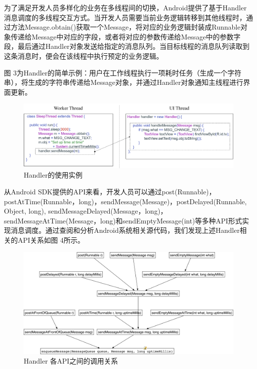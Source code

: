 为了满足开发人员多样化的业务在多线程间的切换，Android提供了基于Handler消息调度的多线程交互方式。当开发人员需要当前业务逻辑转移到其他线程时，通过方法Message.obtain()获取一个Message，将对应的业务逻辑封装成Runnable对象传递给Message中对应的字段，或者将对应的参数传递给Message中的参数字段，最后通过Handler对象发送给指定的消息队列。当目标线程的消息队列读取到这条消息时，便会在该线程中执行预定的业务逻辑。

图 3为Handler的简单示例：用户在工作线程执行一项耗时任务（生成一个字符串），将生成的字符串传递给Message对象，并通过Handler对象通知主线程进行界面更新。
 
 
\begin{figure}
	\centering
	\includegraphics[width=\textwidth]{./Figures/handler-code.png}
	\caption{Handler的使用实例}
	\label{fig:handler-code}
\end{figure}


从Android SDK提供的API来看，开发人员可以通过post(Runnable)，postAtTime(Runnable，long)，sendMessage(Message)，postDelayed(Runnable, Object, long), sendMessageDelayed(Message，long)，sendMessageAtTime(Message，long)和sendEmptyMessage(int)等多种API形式实现消息调度。通过查阅和分析Android系统相关源代码，我们发现上述Handler相关的API关系如图 4所示。

 
 \begin{figure}
	\centering
	\includegraphics[width=\textwidth]{./Figures/Handler-apis.png}
	\caption{ Handler 各API之间的调用关系}
	\label{fig:handler-apis}
\end{figure}


